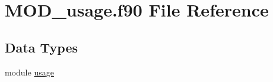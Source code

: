 \hypertarget{MOD__usage_8f90}{\section{M\-O\-D\-\_\-usage.\-f90 File Reference}
\label{MOD__usage_8f90}
}
\subsection*{Data Types}
\begin{DoxyCompactItemize}
\item 
module \hyperlink{classusage}{usage}
\end{DoxyCompactItemize}
